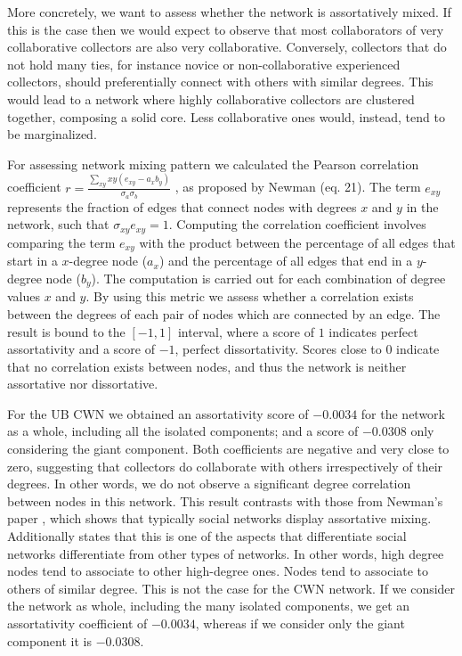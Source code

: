 More concretely, we want to assess whether the network is assortatively mixed.
If this is the case then we would expect to observe that most collaborators of very collaborative collectors are also very collaborative.
Conversely, collectors that do not hold many ties, for instance novice or non-collaborative experienced collectors, should preferentially connect with others with similar degrees.
This would lead to a network where highly collaborative collectors are clustered together, composing a solid core. Less collaborative ones would, instead, tend to be marginalized. %

For assessing network mixing pattern we calculated the Pearson correlation coefficient $r = \frac{\sum_{xy} xy(e_{xy}-a_xb_y)}{\sigma_a \sigma_b}$ , as proposed by Newman \cite{Newman2003c} (eq. 21).
The term $e_{xy}$ represents the fraction of edges that connect nodes with degrees $x$ and $y$ in the network, such that $\sigma_{xy}e_{xy}=1$. 
Computing the correlation coefficient involves comparing the term $e_{xy}$ with the product between the percentage of all edges that start in a $x$-degree node ($a_x$) and the percentage of all edges that end in a $y$-degree node ($b_y$). The computation is carried out for each combination of degree values $x$ and $y$.
By using this metric we assess whether a correlation exists between the degrees of each pair of nodes which are connected by an edge. 
The result is bound to the $[-1,1]$ interval, where a score of $1$ indicates perfect assortativity and a score of $-1$, perfect dissortativity.
Scores close to $0$ indicate that no correlation exists between nodes, and thus the network is neither assortative nor dissortative.

For the UB CWN we obtained an assortativity score of $-0.0034$ for the network as a whole, including all the isolated components; and a score of $-0.0308$ only considering the giant component.
Both coefficients are negative and very close to zero, suggesting that collectors do collaborate with others irrespectively of their degrees. In other words, we do not observe a significant degree correlation between nodes in this network. 
This result contrasts with those from Newman's paper \cite{Newman2003b}, which shows that typically social networks display assortative mixing. Additionally states that this is one of the aspects that differentiate social networks differentiate from other types of networks. In other words, high degree nodes tend to associate to other high-degree ones. Nodes tend to associate to others of similar degree.
This is not the case for the CWN network. If we consider the network as whole, including the many isolated components, we get an assortativity coefficient of $-0.0034$, whereas if we consider only the giant component it is $-0.0308$. 


